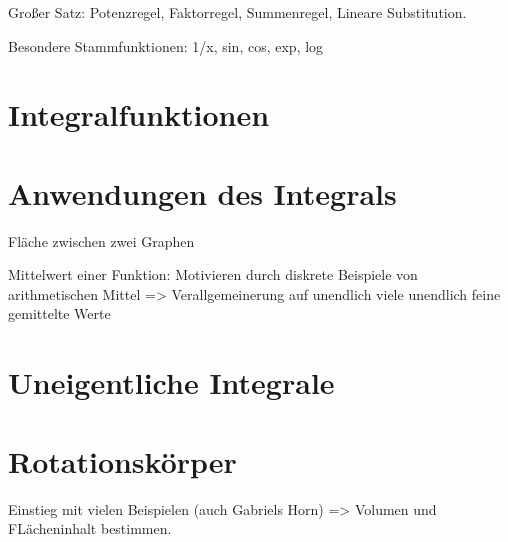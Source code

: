 Großer Satz: Potenzregel, Faktorregel, Summenregel, Lineare Substitution. 
\begin{theorem}[Integrationsregeln]
    
\end{theorem}

Besondere Stammfunktionen: 1/x, sin, cos, exp, log

\begin{theorem}
    
\end{theorem}

\section{Integralfunktionen}

\begin{definition}[Integralfunktion]
    
\end{definition}

\section{Anwendungen des Integrals}
Fläche zwischen zwei Graphen
\begin{theorem}
    
\end{theorem}

Mittelwert einer Funktion: Motivieren durch diskrete Beispiele von arithmetischen Mittel => Verallgemeinerung auf unendlich viele unendlich feine gemittelte Werte
\begin{definition}
    
\end{definition}

\section{Uneigentliche Integrale}

\begin{definition}
    
\end{definition}

\section{Rotationskörper}
Einstieg mit vielen Beispielen (auch Gabriels Horn) => Volumen und FLächeninhalt bestimmen. 

